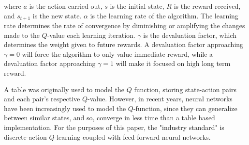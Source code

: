 \noindent
where $a$ is the action carried out, $s$ is the initial state, $R$ is the reward received, and $s_{t+1}$ is the new state.
$\alpha$ is the learning rate of the algorithm.
The learning rate determines the rate of convergence by diminishing or amplifying the changes made to the $Q$-value each learning iteration.
$\gamma$ is the devaluation factor, which determines the weight given to future rewards.
A devaluation factor approaching $\gamma=0$ will force the algorithm to only value immediate reward, while a devaluation factor approaching $\gamma=1$ will make it focused on high long term reward.

A table was originally used to model the $Q$ function, storing state-action pairs and each pair's respective $Q$-value.
However, in recent years, neural networks have been increasingly used to model the $Q$-function, since they can generalize between similar states, and so, converge in less time than a table based implementation.
For the purposes of this paper, the "industry standard" is discrete-action $Q$-learning coupled with feed-forward neural networks.
